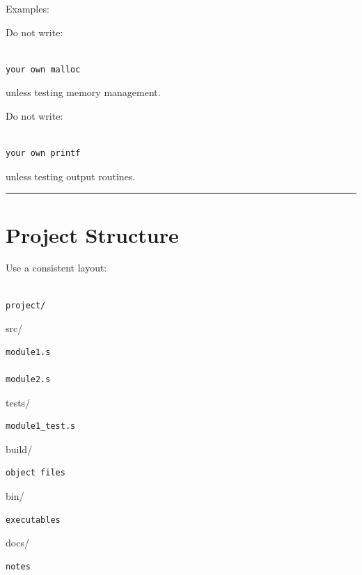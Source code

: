 \documentclass[
  oneside,
  openany]{book}
\begin{document}
Examples:

Do not write:

\begin{verbatim}

your own malloc
\end{verbatim}

unless testing memory management.

Do not write:

\begin{verbatim}

your own printf
\end{verbatim}

unless testing output routines.

\begin{center}\rule{0.5\linewidth}{0.5pt}\end{center}

\hypertarget{project-structure}{%
\section{Project Structure}\label{project-structure}}

Use a consistent layout:

\begin{verbatim}

project/
\end{verbatim}

src/

\begin{verbatim}
module1.s

module2.s
\end{verbatim}

tests/

\begin{verbatim}
module1_test.s
\end{verbatim}

build/

\begin{verbatim}
object files
\end{verbatim}

bin/

\begin{verbatim}
executables
\end{verbatim}

docs/

\begin{verbatim}
notes
\end{verbatim}

\begin{verbatim}
\end{verbatim}
\end{document}
